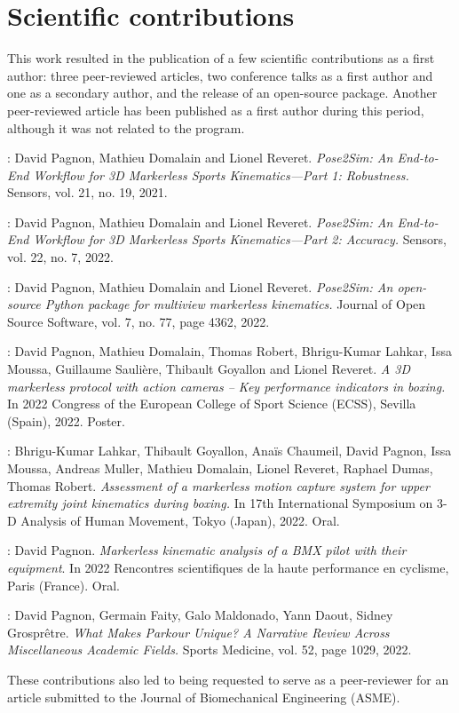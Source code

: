 \newpage
\section*{Scientific contributions} 

This work resulted in the publication of a few scientific contributions as a first author: three peer-reviewed articles, two conference talks as a first author and one as a secondary author, and the release of an open-source package.
Another peer-reviewed article has been published as a first author during this period, although it was not related to the program.

\noindent\cite{Pagnon2021}: David Pagnon, Mathieu Domalain and Lionel Reveret. \textit{Pose2Sim: An
End-to-End Workflow for 3D Markerless Sports Kinematics—Part 1:
Robustness.} Sensors, vol. 21, no. 19, 2021.

\noindent\cite{Pagnon2022a}: David Pagnon, Mathieu Domalain and Lionel Reveret. \textit{Pose2Sim: An
End-to-End Workflow for 3D Markerless Sports Kinematics—Part 2:
Accuracy.} Sensors, vol. 22, no. 7, 2022.

\noindent\cite{Pagnon2022b}: David Pagnon, Mathieu Domalain and Lionel Reveret. \textit{Pose2Sim:
An open-source Python package for multiview markerless kinematics.}
Journal of Open Source Software, vol. 7, no. 77, page 4362, 2022.

\noindent\cite{Pagnon2022c}: 
David Pagnon, Mathieu Domalain, Thomas Robert, Bhrigu-Kumar Lahkar, Issa Moussa, Guillaume Saulière, Thibault Goyallon and Lionel Reveret. \textit{A 3D markerless protocol with action cameras – Key performance indicators in boxing.} In 2022 Congress of the European College of Sport Science (ECSS), Sevilla (Spain), 2022. Poster.

\noindent\cite{Lahkar2022a}: 
Bhrigu-Kumar Lahkar, Thibault Goyallon, Anaïs Chaumeil, David Pagnon, Issa Moussa, Andreas Muller, Mathieu Domalain, Lionel Reveret, Raphael Dumas, Thomas Robert. \textit{Assessment of a markerless motion capture system for upper extremity joint kinematics during boxing.} In 17th International Symposium on 3-D Analysis of Human Movement, Tokyo (Japan), 2022. Oral.


\noindent\cite{Pagnon2022e}: 
David Pagnon. \textit{Markerless kinematic analysis of a BMX pilot with their equipment}. In 2022 Rencontres scientifiques de la haute performance en cyclisme, Paris (France). Oral.

\noindent\cite{Pagnon2022d}: 
David Pagnon, Germain Faity, Galo Maldonado, Yann Daout, Sidney Grosprêtre. \textit{What Makes Parkour Unique? A Narrative Review Across Miscellaneous Academic Fields.} Sports Medicine, vol. 52, page 1029, 2022.

\vskip 0.4cm

These contributions also led to being requested to serve as a peer-reviewer for an article submitted to the Journal of Biomechanical Engineering (ASME).